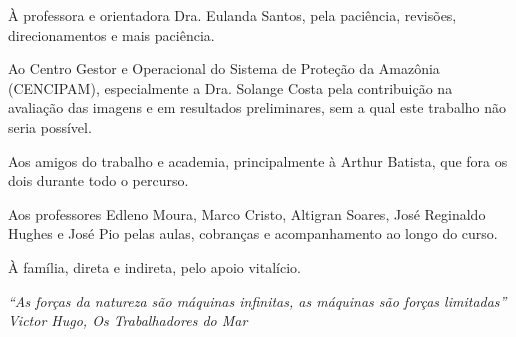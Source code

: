 \begin{agradecimentos}
	À professora e orientadora Dra. Eulanda Santos, pela paciência, revisões, direcionamentos e mais paciência.

	Ao Centro Gestor e Operacional do Sistema de Proteção da Amazônia (CENCIPAM), especialmente a Dra. Solange Costa pela contribuição na avaliação das imagens e em resultados preliminares, sem a qual este trabalho não seria possível.

	Aos amigos do trabalho e academia, principalmente à Arthur Batista, que fora os dois durante todo o percurso.

	Aos professores Edleno Moura, Marco Cristo, Altigran Soares, José Reginaldo Hughes e José Pio pelas aulas, cobranças e acompanhamento ao longo do curso.

	À família, direta e indireta, pelo apoio vitalício.

\end{agradecimentos}

\begin{epigrafe}
	\vspace*{\fill}
	\begin{flushright}
		\textit{``As forças da natureza são máquinas infinitas, as máquinas são forças limitadas''\\Victor Hugo, Os Trabalhadores do Mar}
	\end{flushright}
\end{epigrafe}

\tableofcontents*
\clearpage

\listoffigures
\clearpage

\listoftables
\clearpage

